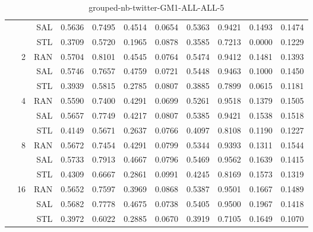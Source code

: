\begin{center}
\begin{table}[htbp]
\begin{center}
\begin{tabular}{ | r | r | r | r | r | r | r | r | r | r | r |}
 &   & SAL & 0.5636 & 0.7495 & 0.4514 & 0.0654 & 0.5363 & 0.9421 & 0.1493 & 0.1474\\ \cline{3-11}
 &   & STL & 0.3709 & 0.5720 & 0.1965 & 0.0878 & 0.3585 & 0.7213 & 0.0000 & 0.1229\\ \cline{2-11}
 & \multirow{3}{*}{2} & RAN & 0.5704 & 0.8101 & 0.4545 & 0.0764 & 0.5474 & 0.9412 & 0.1481 & 0.1393\\ \cline{3-11}
 &   & SAL & 0.5746 & 0.7657 & 0.4759 & 0.0721 & 0.5448 & 0.9463 & 0.1000 & 0.1450\\ \cline{3-11}
 &   & STL & 0.3939 & 0.5815 & 0.2785 & 0.0807 & 0.3885 & 0.7899 & 0.0615 & 0.1181\\ \cline{2-11}
 & \multirow{3}{*}{4} & RAN & 0.5590 & 0.7400 & 0.4291 & 0.0699 & 0.5261 & 0.9518 & 0.1379 & 0.1505\\ \cline{3-11}
 &   & SAL & 0.5657 & 0.7749 & 0.4217 & 0.0807 & 0.5385 & 0.9421 & 0.1538 & 0.1518\\ \cline{3-11}
 &   & STL & 0.4149 & 0.5671 & 0.2637 & 0.0766 & 0.4097 & 0.8108 & 0.1190 & 0.1227\\ \cline{2-11}
 & \multirow{3}{*}{8} & RAN & 0.5672 & 0.7454 & 0.4291 & 0.0799 & 0.5344 & 0.9393 & 0.1311 & 0.1544\\ \cline{3-11}
 &   & SAL & 0.5733 & 0.7913 & 0.4667 & 0.0796 & 0.5469 & 0.9562 & 0.1639 & 0.1415\\ \cline{3-11}
 &   & STL & 0.4309 & 0.6667 & 0.2861 & 0.0991 & 0.4245 & 0.8169 & 0.1573 & 0.1319\\ \cline{2-11}
 & \multirow{3}{*}{16} & RAN & 0.5652 & 0.7597 & 0.3969 & 0.0868 & 0.5387 & 0.9501 & 0.1667 & 0.1489\\ \cline{3-11}
 &   & SAL & 0.5682 & 0.7778 & 0.4675 & 0.0738 & 0.5405 & 0.9500 & 0.1967 & 0.1418\\ \cline{3-11}
 &   & STL & 0.3972 & 0.6022 & 0.2885 & 0.0670 & 0.3919 & 0.7105 & 0.1649 & 0.1070\\ \cline{2-11}
\hline
\end{tabular}
\caption{grouped-nb-twitter-GM1-ALL-ALL-5}
\end{center}
 \end{table}
\end{center}

